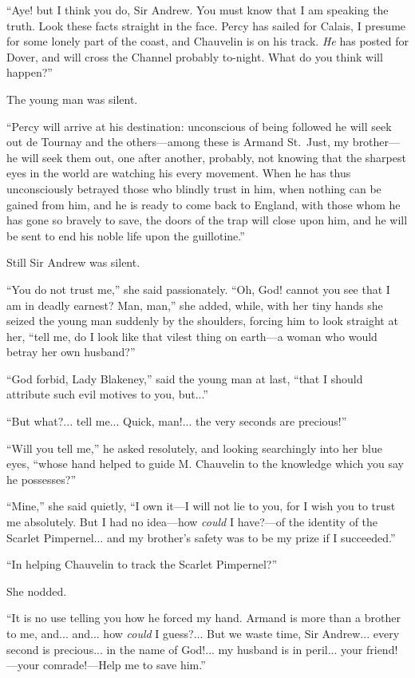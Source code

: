\documentclass[paper=5.5in:8.5in,BCOR=7mm,twoside,DIV=calc,12pt,usegeometry,chapterprefix,endperiod,headings=big]{scrbook}
\begin{document}
\enquote{Aye! but I think you do, Sir Andrew. You must know that I am speaking the truth. Look these facts straight in the face. Percy has sailed for Calais, I presume for some lonely part of the coast, and Chauvelin is on his track. \textit{He} has posted for Dover, and will cross the Channel probably to-night. What do you think will happen?}

The young man was silent.

\enquote{Percy will arrive at his destination: unconscious of being followed he will seek out de Tournay and the others---among these is Armand St.~Just, my brother---he will seek them out, one after another, probably, not knowing that the sharpest eyes in the world are watching his every movement. When he has thus unconsciously betrayed those who blindly trust in him, when nothing can be gained from him, and he is ready to come back to England, with those whom he has gone so bravely to save, the doors of the trap will close upon him, and he will be sent to end his noble life upon the guillotine.}

Still Sir Andrew was silent.

\enquote{You do not trust me,} she said passionately. \enquote{Oh, God! cannot you see that I am in deadly earnest? Man, man,} she added, while, with her tiny hands she seized the young man suddenly by the shoulders, forcing him to look straight at her, \enquote{tell me, do I look like that vilest thing on earth---a woman who would betray her own husband?}

\enquote{God forbid, Lady Blakeney,} said the young man at last, \enquote{that I should attribute such evil motives to you, but...}

\enquote{But what?... tell me... Quick, man!... the very seconds are precious!}

\enquote{Will you tell me,} he asked resolutely, and looking searchingly into her blue eyes, \enquote{whose hand helped to guide M. Chauvelin to the knowledge which you say he possesses?}

\enquote{Mine,} she said quietly, \enquote{I own it---I will not lie to you, for I wish you to trust me absolutely. But I had no idea---how \textit{could} I have?---of the identity of the Scarlet Pimpernel... and my brother's safety was to be my prize if I succeeded.}

\enquote{In helping Chauvelin to track the Scarlet Pimpernel?}

She nodded.

\enquote{It is no use telling you how he forced my hand. Armand is more than a brother to me, and... and... how \textit{could} I guess?... But we waste time, Sir Andrew... every second is precious... in the name of God!... my husband is in peril... your friend!---your comrade!---Help me to save him.}
\end{document}
